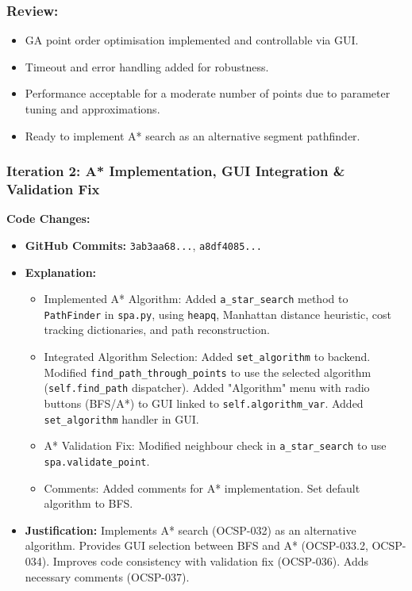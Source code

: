 \subsubsection{Review:}
\begin{itemize}
	\item GA point order optimisation implemented and controllable via GUI.
	\item Timeout and error handling added for robustness.
	\item Performance acceptable for a moderate number of points due to parameter tuning and approximations.
	\item Ready to implement A* search as an alternative segment pathfinder.
\end{itemize}

\newpage

\subsubsection{Iteration 2: A* Implementation, GUI Integration \& Validation Fix}

\textbf{Code Changes:}
\begin{itemize}
	\item \textbf{GitHub Commits:} \verb|3ab3aa68...|, \verb|a8df4085...|
	\item \textbf{Explanation:}
	\begin{itemize}
		\item Implemented A* Algorithm: Added \verb|a_star_search| method to \verb|PathFinder| in \verb|spa.py|, using \verb|heapq|, Manhattan distance heuristic, cost tracking dictionaries, and path reconstruction.
		\item Integrated Algorithm Selection: Added \verb|set_algorithm| to backend. Modified \verb|find_path_through_points| to use the selected algorithm (\verb|self.find_path| dispatcher). Added "Algorithm" menu with radio buttons (BFS/A*) to GUI linked to \verb|self.algorithm_var|. Added \verb|set_algorithm| handler in GUI.
		\item A* Validation Fix: Modified neighbour check in \verb|a_star_search| to use \verb|spa.validate_point|.
		\item Comments: Added comments for A* implementation. Set default algorithm to BFS.
	\end{itemize}
	\item \textbf{Justification:} Implements A* search (OCSP-032) as an alternative algorithm. Provides GUI selection between BFS and A* (OCSP-033.2, OCSP-034). Improves code consistency with validation fix (OCSP-036). Adds necessary comments (OCSP-037).
\end{itemize}

